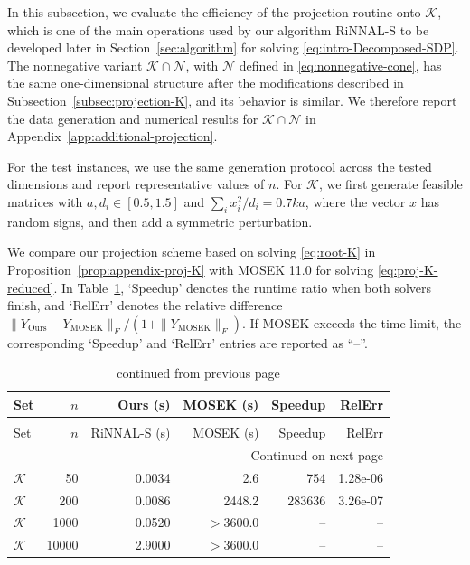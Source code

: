 \documentclass[11pt]{article}
\def\K{\mathcal{K}}
\theoremstyle{plain}
\begin{document}
{
In this subsection, we evaluate the efficiency of the projection routine onto $\K$, which is one of the main operations used by our algorithm RiNNAL-S to be developed later in Section~\ref{sec:algorithm} for solving \eqref{eq:intro-Decomposed-SDP}. The nonnegative variant $\K\cap\mathcal{N}$, with \(\mathcal N\) defined in \eqref{eq:nonnegative-cone}, has the same one-dimensional structure after the modifications described in Subsection~\ref{subsec:projection-K}, and its behavior is similar. We therefore report the data generation and numerical results for $\K\cap\mathcal N$ in Appendix~\ref{app:additional-projection}.

For the test instances, we use the same generation protocol across the tested dimensions and report representative values of $n$. For $\K$, we first generate feasible matrices with $a,d_i\in[0.5,1.5]$ and $\sum_i x_i^2/d_i=0.7ka$, where the vector $x$ has random signs, and then add a symmetric perturbation.

We compare our projection scheme based on solving \eqref{eq:root-K} 
in Proposition~\ref{prop:appendix-proj-K}
with MOSEK 11.0 \cite{mosek}
for solving \eqref{eq:proj-K-reduced}.
In Table~\ref{tab:projection-benchmark-direct}, `Speedup' denotes the runtime ratio when both solvers finish, and `RelErr' denotes the relative difference $\|Y_{\mathrm{Ours}}-Y_{\mathrm{MOSEK}}\|_F/(1+\|Y_{\mathrm{MOSEK}}\|_F)$.
If MOSEK exceeds the time limit, the corresponding `Speedup' and `RelErr' entries are reported as ``--''.

\small
\begin{longtable}{lrrrrr}
\caption{Projection results on $\K$.}
\label{tab:projection-benchmark-direct}\\
\toprule
Set & $n$ & Ours (s) & MOSEK (s) & Speedup & RelErr \\
\midrule
\endfirsthead
\caption[]{continued from previous page}\\
\toprule
Set & $n$ & RiNNAL-S (s) & MOSEK (s) & Speedup & RelErr \\
\midrule
\endhead
\midrule
\multicolumn{6}{r}{Continued on next page}\\
\endfoot
\bottomrule
\endlastfoot
$\K$   & 50    & 0.0034 & 2.6      & 754      & 1.28e-06 \\
$\K$   & 200   & 0.0086 & 2448.2   & 283636   & 3.26e-07 \\
$\K$   & 1000  & 0.0520 & $>3600.0$  & --       & -- \\
$\K$   & 10000 & 2.9000 & $>3600.0$  & --       & -- \\
\end{longtable}
\normalsize

}
\end{document}

